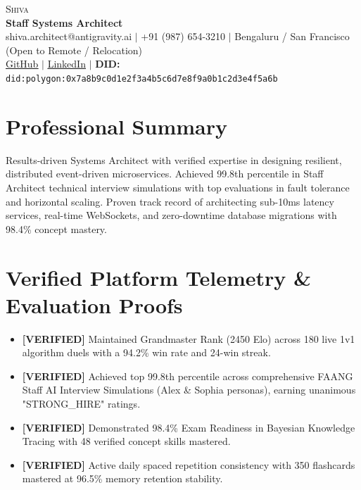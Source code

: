\documentclass[letterpaper,10pt]{article}
\begin{document}
\begin{center}
    {\Huge \scshape Shiva} \\ \vspace{2pt}
    {\large \textbf{Staff Systems Architect}} \\ \vspace{2pt}
    \small shiva.architect@antigravity.ai $|$ +91 (987) 654-3210 $|$ Bengaluru / San Francisco (Open to Remote / Relocation) \\
    \href{https://github.com/Pritamchaurasiya/Learning\_Hub}{\underline{GitHub}} $|$
    \href{https://linkedin.com/in/shiva-ai-architect}{\underline{LinkedIn}} $|$
    \textbf{DID:} \texttt{did:polygon:0x7a8b9c0d1e2f3a4b5c6d7e8f9a0b1c2d3e4f5a6b}
\end{center}

\section{Professional Summary}
\small{Results-driven Systems Architect with verified expertise in designing resilient, distributed event-driven microservices. Achieved 99.8th percentile in Staff Architect technical interview simulations with top evaluations in fault tolerance and horizontal scaling. Proven track record of architecting sub-10ms latency services, real-time WebSockets, and zero-downtime database migrations with 98.4\% concept mastery.}

\section{Verified Platform Telemetry \& Evaluation Proofs}
\begin{itemize}[leftmargin=0.15in, label={\tiny$\blacksquare$}]
  \item \small{\textbf{[VERIFIED]} Maintained Grandmaster Rank (2450 Elo) across 180 live 1v1 algorithm duels with a 94.2\% win rate and 24-win streak.}
  \item \small{\textbf{[VERIFIED]} Achieved top 99.8th percentile across comprehensive FAANG Staff AI Interview Simulations (Alex \& Sophia personas), earning unanimous "STRONG\_HIRE" ratings.}
  \item \small{\textbf{[VERIFIED]} Demonstrated 98.4\% Exam Readiness in Bayesian Knowledge Tracing with 48 verified concept skills mastered.}
  \item \small{\textbf{[VERIFIED]} Active daily spaced repetition consistency with 350 flashcards mastered at 96.5\% memory retention stability.}
\end{itemize}
\end{document}
